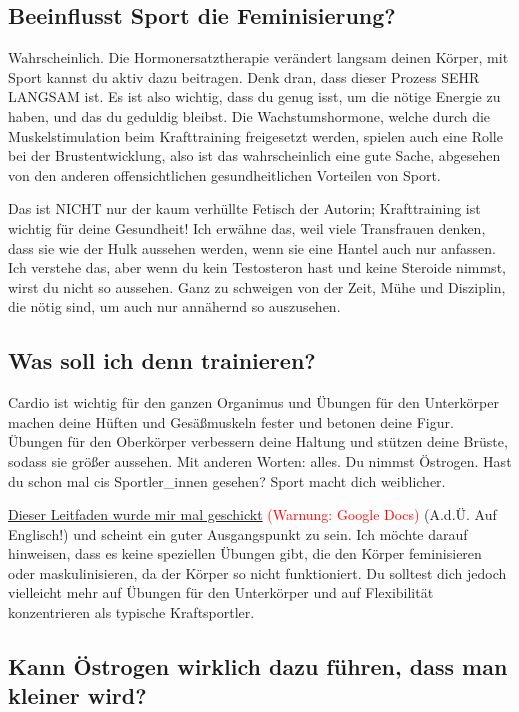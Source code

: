 \documentclass{article}
\begin{document}
\subsection{Beeinflusst Sport die Feminisierung?}

Wahrscheinlich. Die Hormonersatztherapie verändert langsam deinen Körper, mit Sport kannst du aktiv dazu beitragen. Denk dran, dass dieser Prozess SEHR LANGSAM ist. Es ist also wichtig, dass du genug isst, um die nötige Energie zu haben, und das du geduldig bleibst. Die Wachstumshormone, welche durch die Muskelstimulation beim Krafttraining freigesetzt werden, spielen auch eine Rolle bei der Brustentwicklung, also ist das wahrscheinlich eine gute Sache, abgesehen von den anderen offensichtlichen gesundheitlichen Vorteilen von Sport.

Das ist NICHT nur der kaum verhüllte Fetisch der Autorin; Krafttraining ist wichtig für deine Gesundheit! Ich erwähne das, weil viele Transfrauen denken, dass sie wie der Hulk aussehen werden, wenn sie eine Hantel auch nur anfassen. Ich verstehe das, aber wenn du kein Testosteron hast und keine Steroide nimmst, wirst du nicht so aussehen. Ganz zu schweigen von der Zeit, Mühe und Disziplin, die nötig sind, um auch nur annähernd so auszusehen.

\subsection{Was soll ich denn trainieren?}\label{11-16}

Cardio ist wichtig für den ganzen Organimus und Übungen für den Unterkörper machen deine Hüften und Gesäßmuskeln fester und betonen deine Figur. Übungen für den Oberkörper verbessern deine Haltung und stützen deine Brüste, sodass sie größer aussehen. Mit anderen Worten: alles. Du nimmst Östrogen. Hast du schon mal cis Sportler\_innen gesehen? Sport macht dich weiblicher.

\href{https://docs.google.com/document/d/1-NyE5EY5TTaRRMhk7HlTbKJ7HifjEsA4jlDO1qKQVl0/edit?tab=t.0}{Dieser Leitfaden wurde mir mal geschickt} \textcolor{red}{(Warnung: Google Docs)} (A.d.Ü. Auf Englisch!) und scheint ein guter Ausgangspunkt zu sein. Ich möchte darauf hinweisen, dass es keine speziellen Übungen gibt, die den Körper feminisieren oder maskulinisieren, da der Körper so nicht funktioniert. Du solltest dich jedoch vielleicht mehr auf Übungen für den Unterkörper und auf Flexibilität konzentrieren als typische Kraftsportler.

\subsection{Kann Östrogen wirklich dazu führen, dass man kleiner wird?}
\end{document}
